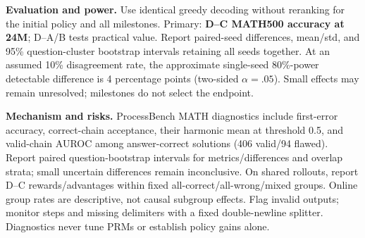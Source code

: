 \documentclass{article}
\begin{document}
\textbf{Evaluation and power.} Use identical greedy decoding without reranking for the initial policy and all milestones. Primary: \textbf{D--C MATH500 accuracy at 24M}; D--A/B tests practical value. Report paired-seed differences, mean/std, and 95\% question-cluster bootstrap intervals retaining all seeds together. At an assumed 10\% disagreement rate, the approximate single-seed 80\%-power detectable difference is 4 percentage points (two-sided $\alpha=.05$). Small effects may remain unresolved; milestones do not select the endpoint.

\textbf{Mechanism and risks.} ProcessBench MATH diagnostics include first-error accuracy, correct-chain acceptance, their harmonic mean at threshold 0.5, and valid-chain AUROC among answer-correct solutions (406 valid/94 flawed). Report paired question-bootstrap intervals for metrics/differences and overlap strata; small uncertain differences remain inconclusive. On shared rollouts, report D--C rewards/advantages within fixed all-correct/all-wrong/mixed groups. Online group rates are descriptive, not causal subgroup effects. Flag invalid outputs; monitor steps and missing delimiters with a fixed double-newline splitter. Diagnostics never tune PRMs or establish policy gains alone.
\end{document}
